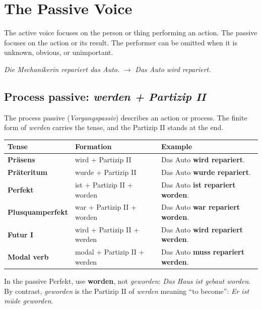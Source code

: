 \chapter{The Passive Voice}

The active voice focuses on the person or thing performing an action. The
passive focuses on the action or its result. The performer can be omitted when
it is unknown, obvious, or unimportant.

\begin{center}
\textit{Die Mechanikerin repariert das Auto.}
\quad $\longrightarrow$ \quad
\textit{Das Auto wird repariert.}
\end{center}

\section{Process passive: \textit{werden + Partizip II}}

The process passive (\textit{Vorgangspassiv}) describes an action or process.
The finite form of \textit{werden} carries the tense, and the Partizip II
stands at the end.

\begin{center}
\small
{}
\begin{tabularx}{\textwidth}{@{}>{\bfseries}l l X@{}}
\toprule
Tense & Formation & Example \\
\midrule
Präsens & wird + Partizip II & Das Auto \textbf{wird repariert}. \\
Präteritum & wurde + Partizip II & Das Auto \textbf{wurde repariert}. \\
Perfekt & ist + Partizip II + worden & Das Auto \textbf{ist repariert worden}. \\
Plusquamperfekt & war + Partizip II + worden & Das Auto \textbf{war repariert worden}. \\
Futur I & wird + Partizip II + werden & Das Auto \textbf{wird repariert werden}. \\
Modal verb & modal + Partizip II + werden & Das Auto \textbf{muss repariert werden}. \\
\bottomrule
\end{tabularx}
\end{center}

In the passive Perfekt, use \textbf{worden}, not \textit{geworden}:
\textit{Das Haus ist gebaut worden}. By contrast, \textit{geworden} is the
Partizip II of \textit{werden} meaning ``to become'':
\textit{Er ist müde geworden}.

